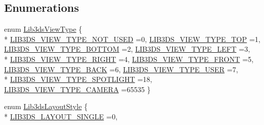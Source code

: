 \subsection*{Enumerations}
\begin{DoxyCompactItemize}
\item 
enum \hyperlink{group__viewport_ga87cb58d3ca8782c6384c08c0db775636}{Lib3ds\-View\-Type} \{ \\*
\hyperlink{group__viewport_gga87cb58d3ca8782c6384c08c0db775636affa44d532fcfa7e740092cbe3244f2f3}{L\-I\-B3\-D\-S\-\_\-\-V\-I\-E\-W\-\_\-\-T\-Y\-P\-E\-\_\-\-N\-O\-T\-\_\-\-U\-S\-E\-D} =0, 
\hyperlink{group__viewport_gga87cb58d3ca8782c6384c08c0db775636afe9d29e57ee74a24b54abe8fd4a388db}{L\-I\-B3\-D\-S\-\_\-\-V\-I\-E\-W\-\_\-\-T\-Y\-P\-E\-\_\-\-T\-O\-P} =1, 
\hyperlink{group__viewport_gga87cb58d3ca8782c6384c08c0db775636a3b303a639f72ec9a92edda5738dd8f42}{L\-I\-B3\-D\-S\-\_\-\-V\-I\-E\-W\-\_\-\-T\-Y\-P\-E\-\_\-\-B\-O\-T\-T\-O\-M} =2, 
\hyperlink{group__viewport_gga87cb58d3ca8782c6384c08c0db775636afccd7e122eed1ba729d441ffe123a2bf}{L\-I\-B3\-D\-S\-\_\-\-V\-I\-E\-W\-\_\-\-T\-Y\-P\-E\-\_\-\-L\-E\-F\-T} =3, 
\\*
\hyperlink{group__viewport_gga87cb58d3ca8782c6384c08c0db775636add04e1d111303f539cb79f9e5e594087}{L\-I\-B3\-D\-S\-\_\-\-V\-I\-E\-W\-\_\-\-T\-Y\-P\-E\-\_\-\-R\-I\-G\-H\-T} =4, 
\hyperlink{group__viewport_gga87cb58d3ca8782c6384c08c0db775636a73989c8b4ef9c41be23a3d3fccedf276}{L\-I\-B3\-D\-S\-\_\-\-V\-I\-E\-W\-\_\-\-T\-Y\-P\-E\-\_\-\-F\-R\-O\-N\-T} =5, 
\hyperlink{group__viewport_gga87cb58d3ca8782c6384c08c0db775636a4b2f069114a445d5f34b759f70c05327}{L\-I\-B3\-D\-S\-\_\-\-V\-I\-E\-W\-\_\-\-T\-Y\-P\-E\-\_\-\-B\-A\-C\-K} =6, 
\hyperlink{group__viewport_gga87cb58d3ca8782c6384c08c0db775636a3d44c7c4584f8a973c73864afb4b58c6}{L\-I\-B3\-D\-S\-\_\-\-V\-I\-E\-W\-\_\-\-T\-Y\-P\-E\-\_\-\-U\-S\-E\-R} =7, 
\\*
\hyperlink{group__viewport_gga87cb58d3ca8782c6384c08c0db775636a6bb426558d2080f666931f99438f3395}{L\-I\-B3\-D\-S\-\_\-\-V\-I\-E\-W\-\_\-\-T\-Y\-P\-E\-\_\-\-S\-P\-O\-T\-L\-I\-G\-H\-T} =18, 
\hyperlink{group__viewport_gga87cb58d3ca8782c6384c08c0db775636abf1fbc15a0300877b7a070c30a4e83d8}{L\-I\-B3\-D\-S\-\_\-\-V\-I\-E\-W\-\_\-\-T\-Y\-P\-E\-\_\-\-C\-A\-M\-E\-R\-A} =65535
 \}
\item 
enum \hyperlink{group__viewport_ga8988e271ccec7ae44750514209e2ac66}{Lib3ds\-Layout\-Style} \{ \\*
\hyperlink{group__viewport_gga8988e271ccec7ae44750514209e2ac66a245a36e0b69264431e8052ee5782042d}{L\-I\-B3\-D\-S\-\_\-\-L\-A\-Y\-O\-U\-T\-\_\-\-S\-I\-N\-G\-L\-E} =0, 

\end{DoxyCompactItemize}
